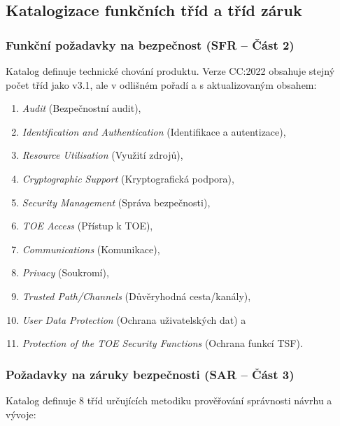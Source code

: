 \documentclass[10pt,a4paper]{article}
\begin{document}
	\subsection{Katalogizace funkčních tříd a tříd záruk}
	\subsubsection*{Funkční požadavky na bezpečnost (SFR -- Část 2)}
	Katalog definuje technické chování produktu. Verze CC:2022 obsahuje stejný počet tříd jako v3.1, ale v odlišném pořadí a s aktualizovaným obsahem:
	
	\begin{minipage}{0.50\textwidth}
		\begin{enumerate}
			\item \textit{Audit} (Bezpečnostní audit), 
			\item \textit{Identification and Authentication} (Identifikace a autentizace), 
			\item \textit{Resource Utilisation} (Využití zdrojů), 
			\item \textit{Cryptographic Support} (Kryptografická podpora), 
			\item \textit{Security Management} (Správa bezpečnosti), 
			\item \textit{TOE Access} (Přístup k TOE), 
		\end{enumerate}
	\end{minipage}
	\begin{minipage}{0.45\textwidth}
		\begin{enumerate}\setcounter{enumi}{6} 
			\item \textit{Communications} (Komunikace), 
			\item \textit{Privacy} (Soukromí), 
			\item \textit{Trusted Path/Channels} (Důvěryhodná cesta/kanály), 
			\item \textit{User Data Protection} (Ochrana uživatelských dat) a 
			\item \textit{Protection of the TOE Security Functions} (Ochrana funkcí TSF).
		\end{enumerate}
	\end{minipage}
	
	\subsubsection*{Požadavky na záruky bezpečnosti (SAR -- Část 3)}
	Katalog definuje 8 tříd určujících metodiku prověřování správnosti návrhu a vývoje:
	
\end{document}
